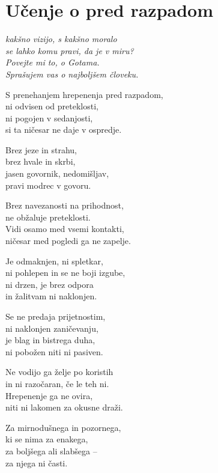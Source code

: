 \cleartorecto
{}
\chapter{Učenje o pred razpadom}

\emph{kakšno vizijo, s kakšno moralo\\
se lahko komu pravi, da je v miru?\\
Povejte mi to, o Gotama.\\
Sprašujem vas o najboljšem človeku.}

S prenehanjem hrepenenja pred razpadom,\\
ni odvisen od preteklosti,\\
ni pogojen v sedanjosti,\\
si ta ničesar ne daje v ospredje.

\clearpage

Brez jeze in strahu,\\
brez hvale in skrbi,\\
jasen govornik, nedomišljav,\\
pravi modrec v govoru.

Brez navezanosti na prihodnost,\\
ne obžaluje preteklosti.\\
Vidi osamo med vsemi kontakti,\\
ničesar med pogledi ga ne zapelje.

Je odmaknjen, ni spletkar,\\
ni pohlepen in se ne boji izgube,\\
ni drzen, je brez odpora\\
in žalitvam ni naklonjen.

Se ne predaja prijetnostim,\\
ni naklonjen zaničevanju,\\
je blag in bistrega duha,\\
ni pobožen niti ni pasiven.

Ne vodijo ga želje po koristih\\
in ni razočaran, če le teh ni.\\
Hrepenenje ga ne ovira,\\
niti ni lakomen za okusne draži.

Za mirnodušnega in pozornega,\\
ki se nima za enakega,\\
za boljšega ali slabšega --\\
za njega ni časti.

